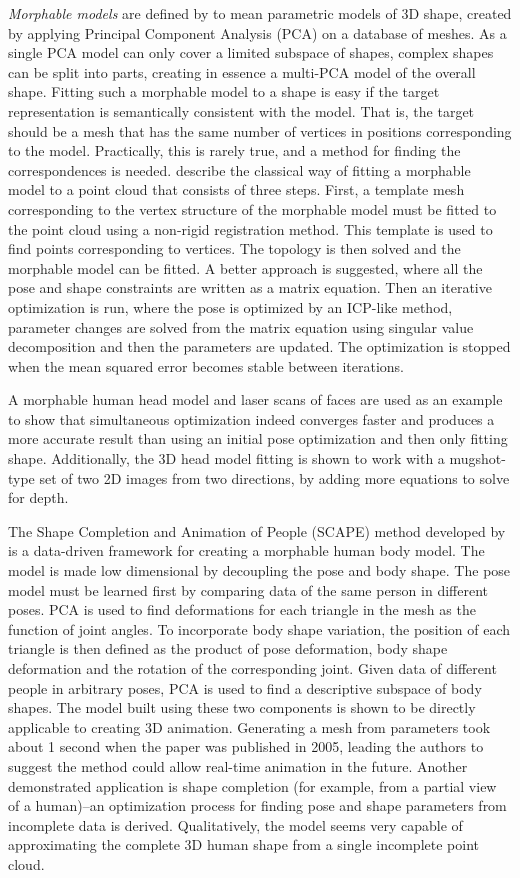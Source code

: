 \textit{Morphable models} are defined by \citet{schneider2010fitting} to mean parametric models of 3D shape, created by applying Principal Component Analysis (PCA) on a database of meshes. As a single PCA model can only cover a limited subspace of shapes, complex shapes can be split into parts, creating in essence a multi-PCA model of the overall shape. Fitting such a morphable model to a shape is easy if the target representation is semantically consistent with the model. That is, the target should be a mesh that has the same number of vertices in positions corresponding to the model. Practically, this is rarely true, and a method for finding the correspondences is needed. \citet{schneider2010fitting} describe the classical way of fitting a morphable model to a point cloud that consists of three steps. First, a template mesh corresponding to the vertex structure of the morphable model must be fitted to the point cloud using a non-rigid registration method. This template is used to find points corresponding to vertices. The topology is then solved and the morphable model can be fitted. A better approach is suggested, where all the pose and shape constraints are written as a matrix equation. Then an iterative optimization is run, where the pose is optimized by an ICP-like method, parameter changes are solved from the matrix equation using singular value decomposition and then the parameters are updated. The optimization is stopped when the mean squared error becomes stable between iterations.

A morphable human head model and laser scans of faces are used as an example to show that simultaneous optimization indeed converges faster and produces a more accurate result than using an initial pose optimization and then only fitting shape. Additionally, the 3D head model fitting is shown to work with a mugshot-type set of two 2D images from two directions, by adding more equations to solve for depth.

The Shape Completion and Animation of People (SCAPE) method developed by \citet{anguelov2005scape} is a data-driven framework for creating a morphable human body model. The model is made low dimensional by decoupling the pose and body shape. The pose model must be learned first by comparing data of the same person in different poses. PCA is used to find deformations for each triangle in the mesh as the function of joint angles. To incorporate body shape variation, the position of each triangle is then defined as the product of pose deformation, body shape deformation and the rotation of the corresponding joint. Given data of different people in arbitrary poses, PCA is used to find a descriptive subspace of body shapes. The model built using these two components is shown to be directly applicable to creating 3D animation. Generating a mesh from parameters took about 1 second when the paper was published in 2005, leading the authors to suggest the method could allow real-time animation in the future. Another demonstrated application is shape completion (for example, from a partial view of a human)--an optimization process for finding pose and shape parameters from incomplete data is derived. Qualitatively, the model seems very capable of approximating the complete 3D human shape from a single incomplete point cloud.

